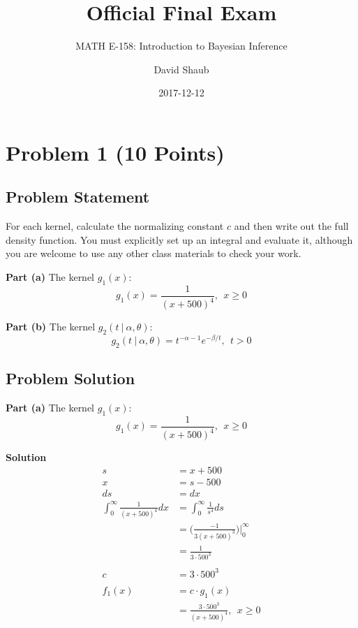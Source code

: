 \documentclass[12pt]{article}
\title{Official Final Exam}
\author{MATH E-158: Introduction to Bayesian Inference}
\author{David Shaub}
\date{2017-12-12}
\theoremstyle{definition}
\begin{document}
	
	\maketitle


\section*{Problem 1 (10 Points)}


\subsection*{Problem Statement}

For each kernel, calculate the normalizing constant $c$ and then write out the full density function. You must explicitly set up an integral and evaluate it, although you are welcome to use any other class materials to check your work.

\bigskip
\noindent
{\bf Part (a)} The kernel $g_1(x)$:
$$
g_1(x) = \frac{1}{(x + 500)^4},\ \ x \geq 0
$$

\bigskip
\noindent
{\bf Part (b)} The kernel $g_2(t\ |\ \alpha, \theta)$:
$$
g_2(t\ |\ \alpha, \theta) = t^{-\alpha-1} e^{-\beta/t},\ \ t > 0
$$



\subsection*{Problem Solution}

\noindent
{\bf Part (a)} The kernel $g_1(x)$:
$$
g_1(x) = \frac{1}{(x + 500)^4},\ \ x \geq 0
$$

\bigskip
\noindent
{\bf Solution} 
\begin{align*}
s &= x + 500\\
x &= s - 500\\
ds &= dx\\
\int_0^\infty \frac{1}{(x + 500)^4}dx &= \int_0^\infty \frac{1}{s^4}ds\\
&= \biggr(\frac{-1}{3(x + 500)^3}\biggr)\biggr|_0^\infty\\
&= \frac{1}{3\cdot 500^3}\\\\
c &= 3\cdot 500^3\\\\
f_1(x) &= c \cdot g_1(x)\\
&= \frac{3\cdot500^3}{(x + 500)^4},\ \ x \geq 0
\end{align*}
\end{document}
